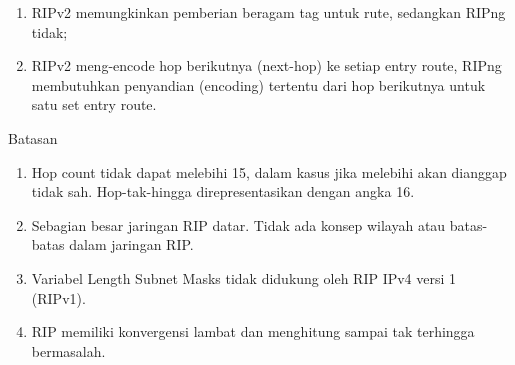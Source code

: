 \documentclass[a4paper,12pt]{article}
\begin{document}
\begin{enumerate}
\begin{enumerate}[label=\alph*.]
		\item RIPv2 memungkinkan pemberian beragam tag untuk rute, sedangkan RIPng tidak;
		
		\item RIPv2 meng-encode hop berikutnya (next-hop) ke setiap entry route, RIPng membutuhkan penyandian (encoding) tertentu dari hop berikutnya untuk satu set entry route.
		
	\end{enumerate}
	Batasan
	\begin{enumerate}[label=\arabic*.]
		\item Hop count tidak dapat melebihi 15, dalam kasus jika melebihi akan dianggap tidak sah. Hop-tak-hingga direpresentasikan dengan angka 16.
		
		\item Sebagian besar jaringan RIP datar. Tidak ada konsep wilayah atau batas-batas dalam jaringan RIP.
		
		\item Variabel Length Subnet Masks tidak didukung oleh RIP IPv4 versi 1 (RIPv1).
		
		\item RIP memiliki konvergensi lambat dan menghitung sampai tak terhingga bermasalah.
		
	\end{enumerate}
\end{enumerate}

\newpage
\end{document}
